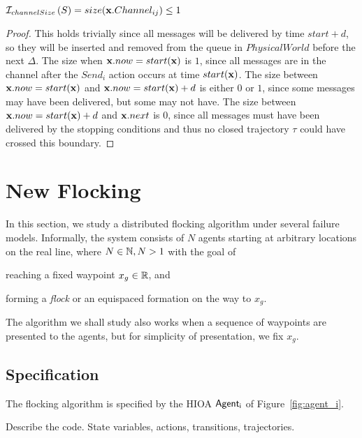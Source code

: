 \documentclass[10pt, conference, compsocconf]{IEEEtran}
\begin{document}
\begin{inv}

${\cal I}_{channelSize}\left(S\right) = size({\bf x}.Channel_{ij}) \leq 1$

\end{inv}

\begin{proof}
This holds trivially since all messages will be delivered by time $start + d$, so they will be inserted and removed from the queue in $PhysicalWorld$ before the next $\Delta$.  The size when ${\bf x}.now = start({\bf x})$ is $1$, since all messages are in the channel after the $Send_i$ action occurs at time $start({\bf x})$.  The size between ${\bf x}.now = start({\bf x})$ and ${\bf x}.now = start({\bf x}) + d$ is either $0$ or $1$, since some messages may have been delivered, but some may not have.  The size between ${\bf x}.now = start({\bf x}) + d$ and ${\bf x}.next$ is $0$, since all messages must have been delivered by the stopping conditions and thus no closed trajectory $\tau$ could have crossed this boundary.
\end{proof}

\section{New Flocking}
\label{sec:flocking}

In this section, we study a 
distributed flocking algorithm under several
failure models. 
%
Informally, the system consists of $N$ agents starting at arbitrary 
locations on the real line, where $N \in \naturals, N > 1$
with the goal of 
\begin{inparaenum}[(a)]
\item reaching a fixed waypoint $x_g \in \reals$, and 
\item forming a {\em flock\/} or an equispaced formation on the way to $x_g$.
\end{inparaenum}  
The algorithm we shall study also works when a sequence of waypoints 
are presented to the agents, but for simplicity of presentation, 
we fix $x_g$.

\subsection{Specification}
\label{sec:flockspec}
The flocking algorithm is specified by the HIOA ${\operatorname{\mathsf{Agent_i}}}$ of 
Figure~\ref{fig:agent_i}.

Describe the code. State variables, actions, transitions, trajectories.
\end{document}
